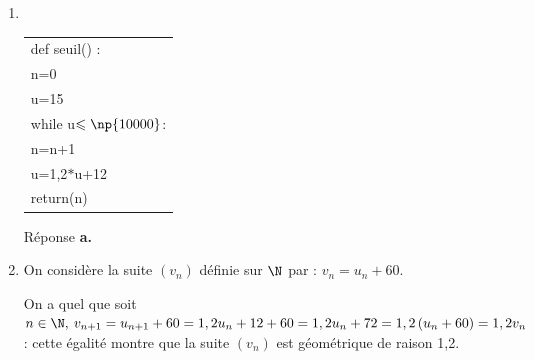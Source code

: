 \begin{enumerate}
Pour les questions \textbf{3.} et \textbf{4.}, on considère la suite $\left(u_n\right)$ définie sur $\N$ par:
\[u_0 = 15 \quad \text{et pour tout entier naturel }\: n \quad :\: u_{n+1} = 1,2u_n + 12.\]

\item ~%

\begin{center}
\begin{tabular}{|>{\ttfamily}l|}\hline
def seuil() :\\
\qquad n=0\\
\qquad u=15\\
\qquad while u$\leqslant \np{10000}$:\\
\qquad \quad n=n+1\\
\qquad \quad u=1,2$*$u+12\\
\qquad return(n)\\ \hline
\end{tabular}
\end{center}

Réponse \textbf{a.}
%

\item On considère la suite $\left(v_n\right)$ définie sur $\N$ par : $v_n = u_n + 60$. 

%
On a quel que soit $n \in \N, \: v_{n+1} = u_{n+1} + 60 =  1,2u_n + 12 + 60 = 1,2u_n + 72 = 1,2\left(u_n + 60\right) = 1,2v_n$ : cette égalité montre que la suite $\left(v_n\right)$ est géométrique de raison 1,2.
\end{enumerate}

\bigskip

